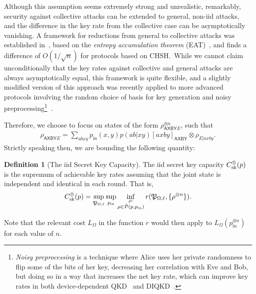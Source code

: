 \documentclass[10pt, a4paper]{article}
\numberwithin{equation}{section} %
\newcounter{stmt} %
\theoremstyle{definition}
\newtheorem{defn}[stmt]{Definition}
\theoremstyle{plain}
\newcommand{\?}{\mathrel{?}} %
\newcommand{\crv}[1]{\mathsf{#1}}
\newcommand{\proj}[2][]{{[#2]}_{#1}}
\newcommand{\compatstates}[3][]{\hat{\mathcal{P}}#1(#2,#3)}
\newcommand{\proto}[2][_{\Omega,\ell}]{\mathfrak{#2}#1}
\newcommand{\prin}[1][p]{#1_{\mathrm{in}}}
\newcommand{\sk}{\rm sk}
\begin{document}
    Although this assumption seems extremely strong and unrealistic, remarkably, security against collective attacks can be extended to general, non-iid attacks, and the difference in the key rate from the collective case can be asymptotically vanishing. A framework for reductions from general to collective attacks was established in~\cite{DI_Proofs}, based on the \emph{entropy accumulation theorem} (EAT)~\cite{EntAcc}, and finds a difference of \(O(1/\sqrt{n})\) for protocols based on CHSH.\ While we cannot claim unconditionally that the key rates against collective and general attacks are always asymptotically equal, this framework is quite flexible, and a slightly modified version of this approach was recently applied to more advanced protocols involving the random choice of basis for key generation and noisy preprocessing\footnote{\emph{Noisy preprocessing} is a technique where Alice uses her private randomness to flip some of the bits of her key, decreasing her correlation with Eve and Bob, but doing so in a way that increases the net key rate, which can improve key rates in both device-dependent QKD~\cite{NoisyPreproc} and DIQKD~\cite{BFF_QRE, AsymmetricCHSH, DIQKD_FiniteSize}.}~\cite{DIQKD_FiniteSize}. 

    Therefore, we choose to focus on states of the form \( \rho_{\crv{AXBY}E}^{\otimes n} \), such that
    \begin{align}
      \rho_{\crv{AXBY}E} = \sum_{abxy} \prin(x,y) p(ab|xy) \proj[\crv{AXBY}]{axby} \otimes \rho_{E|axby}.
    \end{align}
    Strictly speaking then, we are bounding the following quantity:
    \begin{defn}[The iid Secret Key Capacity]\label{def:seckeycapbehaviid}
      The iid secret key capacity \(C_{\sk}^{\otimes}(p)\) is the supremum of achievable key rates assuming that the joint state is independent and identical in each round. That is,
      \begin{equation}
        C_{\sk}^{\otimes}(p) = \sup_{\proto{P}} \sup_{\prin} \inf_{\substack{\rho : \\ \rho \in \compatstates{p}{\prin}}} r(\proto{P}, \{\rho^{\otimes{n}}\}).
      \end{equation}
    \end{defn}
    Note that the relevant cost \(L_{\Omega}\) in the function \(r\) would then apply to \(L_{\Omega}(\prin^{\otimes n})\) for each value of \(n\).
\end{document}
